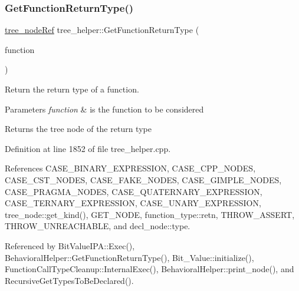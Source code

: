 \subsubsection{\texorpdfstring{Get\+Function\+Return\+Type()}{GetFunctionReturnType()}}
{\footnotesize\ttfamily \hyperlink{tree__node_8hpp_a6ee377554d1c4871ad66a337eaa67fd5}{tree\+\_\+node\+Ref} tree\+\_\+helper\+::\+Get\+Function\+Return\+Type (\begin{DoxyParamCaption}\item[{const \hyperlink{tree__node_8hpp_a6ee377554d1c4871ad66a337eaa67fd5}{tree\+\_\+node\+Ref}}]{function }\end{DoxyParamCaption})\hspace{0.3cm}{\ttfamily [static]}}



Return the return type of a function. 


\begin{DoxyParams}{Parameters}
{\em function} & is the function to be considered \\
\hline
\end{DoxyParams}
\begin{DoxyReturn}{Returns}
the tree node of the return type 
\end{DoxyReturn}


Definition at line 1852 of file tree\+\_\+helper.\+cpp.



References C\+A\+S\+E\+\_\+\+B\+I\+N\+A\+R\+Y\+\_\+\+E\+X\+P\+R\+E\+S\+S\+I\+ON, C\+A\+S\+E\+\_\+\+C\+P\+P\+\_\+\+N\+O\+D\+ES, C\+A\+S\+E\+\_\+\+C\+S\+T\+\_\+\+N\+O\+D\+ES, C\+A\+S\+E\+\_\+\+F\+A\+K\+E\+\_\+\+N\+O\+D\+ES, C\+A\+S\+E\+\_\+\+G\+I\+M\+P\+L\+E\+\_\+\+N\+O\+D\+ES, C\+A\+S\+E\+\_\+\+P\+R\+A\+G\+M\+A\+\_\+\+N\+O\+D\+ES, C\+A\+S\+E\+\_\+\+Q\+U\+A\+T\+E\+R\+N\+A\+R\+Y\+\_\+\+E\+X\+P\+R\+E\+S\+S\+I\+ON, C\+A\+S\+E\+\_\+\+T\+E\+R\+N\+A\+R\+Y\+\_\+\+E\+X\+P\+R\+E\+S\+S\+I\+ON, C\+A\+S\+E\+\_\+\+U\+N\+A\+R\+Y\+\_\+\+E\+X\+P\+R\+E\+S\+S\+I\+ON, tree\+\_\+node\+::get\+\_\+kind(), G\+E\+T\+\_\+\+N\+O\+DE, function\+\_\+type\+::retn, T\+H\+R\+O\+W\+\_\+\+A\+S\+S\+E\+RT, T\+H\+R\+O\+W\+\_\+\+U\+N\+R\+E\+A\+C\+H\+A\+B\+LE, and decl\+\_\+node\+::type.



Referenced by Bit\+Value\+I\+P\+A\+::\+Exec(), Behavioral\+Helper\+::\+Get\+Function\+Return\+Type(), Bit\+\_\+\+Value\+::initialize(), Function\+Call\+Type\+Cleanup\+::\+Internal\+Exec(), Behavioral\+Helper\+::print\+\_\+node(), and Recursive\+Get\+Types\+To\+Be\+Declared().

